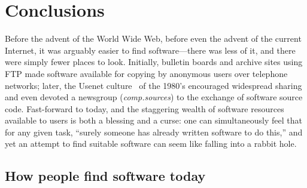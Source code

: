 \documentclass[review]{elsarticle}
\begin{document}
\section{Conclusions}
\label{conclusions}


Before the advent of the World Wide Web, before even the advent of the current Internet, it was arguably easier to find software---there was less of it, and there were simply fewer places to look.  Initially, bulletin boards and archive sites using FTP made software available for copying by anonymous users over telephone networks; later, the Usenet culture~\citep{emerson1983usenet} of the 1980's encouraged widespread sharing and even devoted a newsgroup (\emph{comp.sources}) to the exchange of software source code.  Fast-forward to today, and the staggering wealth of software resources available to users is both a blessing and a curse: one can simultaneously feel that for any given task, ``surely someone has already written software to do this,'' and yet an attempt to find suitable software can seem like falling into a rabbit hole.

\subsection{How people find software today}
\end{document}
